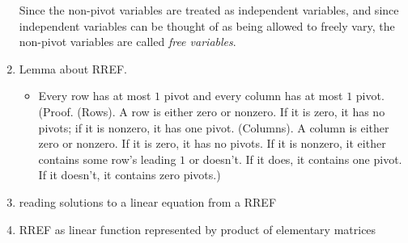 \begin{enumerate}
    Since the non-pivot variables are treated as independent variables, and since independent variables can be thought of as being allowed to freely vary, the non-pivot variables are called \textit{free variables}.
    \item Lemma about RREF.
    \begin{itemize}
        \item Every row has at most $1$ pivot and every column has at most $1$ pivot. (Proof. (Rows). A row is either zero or nonzero. If it is zero, it has no pivots; if it is nonzero, it has one pivot. (Columns). A column is either zero or nonzero. If it is zero, it has no pivots. If it is nonzero, it either contains some row's leading $1$ or doesn't. If it does, it contains one pivot. If it doesn't, it contains zero pivots.)
        \end{itemize}   
    \item reading solutions to a linear equation from a RREF
    \item RREF as linear function represented by product of elementary matrices
\end{enumerate}


